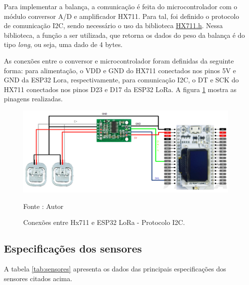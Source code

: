 \par Para implementar a balança, a comunicação é feita do microcontrolador com o módulo conversor A/D e amplificador HX711. Para tal, foi definido o protocolo de comunicação I2C, sendo necessário o uso da biblioteca \href{https://github.com/bogde/HX711}{HX711.h}. Nessa biblioteca, a função a ser utilizada,  que retorna os dados do peso da balança é do tipo \textit{long}, ou seja, uma dado de 4 bytes.

\par As conexões entre o conversor e microcontrolador foram definidas da seguinte forma: para alimentação, o VDD e GND do HX711 conectados nos pinos 5V e GND da ESP32 Lora, respectivamente, para comunicação I2C, o DT e SCK do HX711 conectados nos pinos D23 e D17 da ESP32 LoRa. A figura \ref{fig:PINAGEM_balanca} mostra as pinagens realizadas.  

\begin{figure}[H]
  \centering
  \includegraphics[scale=0.4]{figuras/PINAGEM_BALANCA.png}
  \caption{Conexões entre Hx711 e ESP32 LoRa - Protocolo I2C.} 
  {\footnotesize Fonte : Autor } 
  \label{fig:PINAGEM_balanca}
\end{figure}

\subsection{Especificações dos sensores}

\par A tabela \ref{tab:sensores} apresenta os dados das principais especificações dos sensores citados acima.

